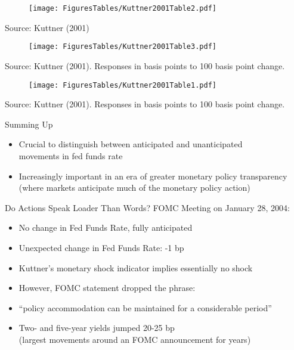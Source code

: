\documentclass[11pt,aspectratio=169,xcolor={dvipsnames},hyperref={pdftex,pdfpagemode=UseNone,hidelinks,pdfdisplaydoctitle=true},usepdftitle=false]{beamer}
\begin{document}
\begin{frame}
\begin{figure}
\centering
\texttt{[image: FiguresTables/Kuttner2001Table2.pdf]}
\end{figure}
\vspace{-7mm}
{\scriptsize Source: Kuttner (2001)}
\end{frame}

\begin{frame}
\begin{figure}
\centering
\texttt{[image: FiguresTables/Kuttner2001Table3.pdf]}
\end{figure}
\vspace{-6mm}
{\scriptsize Source: Kuttner (2001). Responses in basis points to 100 basis point change.}
\end{frame}

\begin{frame}
\begin{figure}
\centering
\texttt{[image: FiguresTables/Kuttner2001Table1.pdf]}
\end{figure}
\vspace{-6mm}
{\scriptsize Source: Kuttner (2001). Responses in basis points to 100 basis point change.}
\end{frame}

\begin{frame}{Summing Up}
\begin{itemize}
\item Crucial to distinguish between anticipated and unanticipated \\ movements in fed funds rate
\item Increasingly important in an era of greater monetary policy transparency \\ (where markets anticipate much of the monetary policy action)
\end{itemize}
\end{frame}


\begin{frame}{Do Actions Speak Loader Than Words?}
FOMC Meeting on January 28, 2004:
\begin{itemize}
\item No change in Fed Funds Rate, fully anticipated
\item Unexpected change in Fed Funds Rate: -1 bp
\item Kuttner's monetary shock indicator implies essentially no shock \pause
\item However, FOMC statement dropped the phrase:
\item[] ``policy accommodation can be maintained for a considerable period'' 
\item Two- and five-year yields jumped 20-25 bp \\ (largest movements around an FOMC announcement for years)
\end{itemize}
\end{frame}
\end{document}
